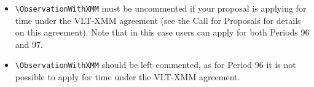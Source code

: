 \documentclass{article}
\begin{document}
\ifodd\period
 \begin{itemize}
  \item \verb|\ObservationWithXMM| must be uncommented if your proposal
   is applying for time under the VLT-XMM agreement (see the Call for
   Proposals for details on this agreement).  Note that in this case
   users can apply for both Periods 96 and 97.
 \end{itemize}
\else
 \begin{itemize}
 \item \verb|\ObservationWithXMM| should be left commented, as for
   Period 96 it is not possible to apply for time under the
   VLT-XMM agreement.
 \end{itemize}
\fi

\end{document}
